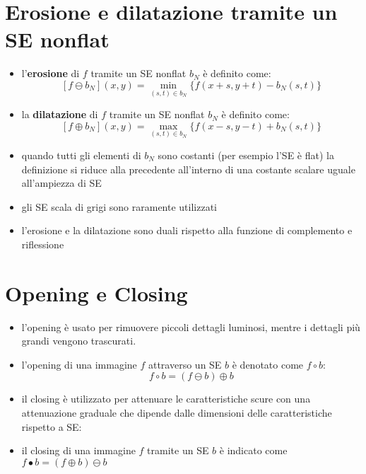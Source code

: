 \section{Erosione e dilatazione tramite un SE nonflat}
\begin{itemize}
	\item l'\textbf{erosione} di $f$ tramite un SE nonflat $b_N$ è definito come:
	$$
	[f \ominus b_N] (x, y) = \displaystyle\min_{(s, t) \in b_N} \{f(x + s, y + t) - b_N(s, t)\}
	$$
	
	\item la \textbf{dilatazione} di $f$ tramite un SE nonflat $b_N$ è definito come:
	$$
	[f \oplus b_N] (x, y) = \displaystyle\max_{(s, t) \in b_N} \{f(x - s, y - t) + b_N(s, t)\}
	$$
	
	\item quando tutti gli elementi di $b_N$ sono costanti (per esempio l'SE è flat) la definizione si riduce alla precedente all'interno di una costante scalare uguale all'ampiezza di SE
	
	\item gli SE scala di grigi sono raramente utilizzati
	
	\item l'erosione e la dilatazione sono duali rispetto alla funzione di complemento e riflessione
\end{itemize}

\section{Opening e Closing}
\begin{itemize}
	\item l'opening è usato per rimuovere piccoli dettagli luminosi, mentre i dettagli più grandi vengono trascurati.
	
	\item l'opening di una immagine $f$ attraverso un SE $b$ è denotato come $f \circ b$:
	$$
	f \circ b = (f \ominus b) \oplus b
	$$
\end{itemize}

\begin{itemize}
	\item il closing è utilizzato per attenuare le caratteristiche scure con una attenuazione graduale che dipende dalle dimensioni delle caratteristiche rispetto a SE:
	
	\item il closing di una immagine $f$ tramite un SE $b$ è indicato come $f \bullet b = (f \oplus b) \ominus b$
\end{itemize}

